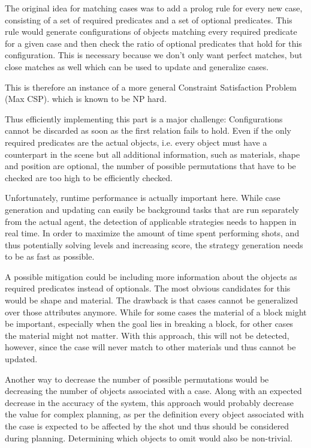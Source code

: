 The original idea for matching cases was to add a prolog rule for every new case, consisting of a set of required predicates and a set of optional predicates.
This rule would generate configurations of objects matching every required predicate for a given case and then check the ratio of optional predicates that hold for this configuration.
This is necessary because we don't only want perfect matches, but close matches as well which can be used to update and generalize cases.

This is therefore an instance of a more general Constraint Satisfaction Problem (Max CSP). which is known to be NP hard.

Thus efficiently implementing this part is a major challenge:
Configurations cannot be discarded as soon as the first relation fails to hold.
Even if the only required predicates are the actual objects, i.e. every object must have a counterpart in the scene but all additional information, such as materials, shape and position are optional, the number of possible permutations that have to be checked are too high to be efficiently checked.

Unfortunately, runtime performance is actually important here. While case generation and updating can easily be background tasks that are run separately from the actual agent, the detection of applicable strategies needs to happen in real time.
In order to maximize the amount of time spent performing shots, and thus potentially solving levels and increasing score, the strategy generation needs to be as fast as possible.

A possible mitigation could be including more information about the objects as required predicates instead of optionals.
The most obvious candidates for this would be shape and material.
The drawback is that cases cannot be generalized over those attributes anymore. While for some cases the material of a block might be important, especially when the goal lies in breaking a block, for other cases the material might not matter.
With this approach, this will not be detected, however, since the case will never match to other materials und thus cannot be updated.

Another way to decrease the number of possible permutations would be decreasing the number of objects associated with a case. Along with an expected decrease in the accuracy of the system, this approach would probably decrease the value for complex planning, as per the definition every object associated with the case is expected to be affected by the shot und thus should be considered during planning.
Determining which objects to omit would also be non-trivial.

